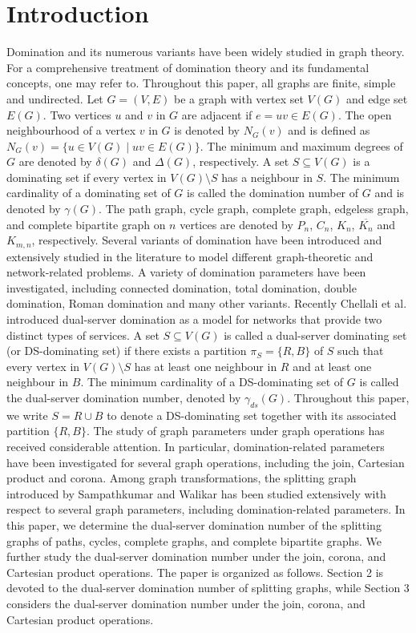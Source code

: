 \documentclass{article}
\begin{document}
\section{Introduction} Domination and its numerous variants have been widely studied in graph theory. For a comprehensive treatment of domination theory and its fundamental concepts, one may refer to\cite{Haynes1998,Haynes2023,HBW,Slater1998}. Throughout this paper, all graphs are finite, simple and undirected. Let $G=(V,E)$ be a graph with vertex set $V(G)$ and edge set $E(G).$ Two vertices $u$ and $v$ in $G$ are adjacent if $e = uv \in E(G).$ The open neighbourhood of a vertex $v$ in $G$ is denoted by $N_G(v)$ and is defined as
$N_G(v)=\{u \in V(G) \mid uv \in E(G)\}$. The minimum and maximum degrees of $G$ are denoted by $\delta(G)$ and $\Delta(G)$, respectively. A set $ S\subseteq V(G)$ is a dominating set if every vertex in $V(G) \setminus S$ has a neighbour in $S.$ The minimum cardinality of a dominating set of $G$ is called the domination number of $G$ and is denoted by $\gamma(G)$. The path graph, cycle graph, complete graph, edgeless graph, and complete bipartite graph on $n$ vertices are denoted by $P_n$, $C_n$, ${K_n}$, $\overline{K_n}$ and $K_{m,n}$, respectively. Several variants of domination have been introduced and extensively studied in the literature to model different graph-theoretic and network-related problems. A variety of domination parameters have been investigated, including connected domination, total domination, double domination, Roman domination and many other variants\cite{Haynes2023}. Recently Chellali et al.\cite{DS,TDS} introduced dual-server domination  as a model for networks that provide two distinct types of services. A set $S \subseteq V(G)$ is called a dual-server dominating set (or DS-dominating set) if there exists a partition $\pi_S=\{R,B\}$ of $S$ such that every vertex in $V(G)\setminus S$ has at least one neighbour in $R$ and at least one neighbour in $B.$ The minimum cardinality of a DS-dominating set of $G$ is called the dual-server domination number, denoted by $\gamma_{ds}(G).$ Throughout this paper, we write $S=R \cup B$ to denote a DS-dominating set together with its associated partition $\{R,B\}$. The study of graph parameters under graph operations has received considerable attention. In particular, domination-related parameters have been investigated for several graph operations, including the join, Cartesian product and corona\cite{West}. Among graph transformations, the splitting graph introduced by Sampathkumar and Walikar\cite{SPG} has been studied extensively with respect to several graph parameters, including domination-related parameters\cite{Deepalaxmi}. In this paper, we determine the dual-server domination number of the splitting graphs of paths, cycles, complete graphs, and complete bipartite graphs. We further study the dual-server domination number under the join, corona, and Cartesian product operations. The paper is organized as follows. Section 2 is devoted to the dual-server domination number of splitting graphs, while Section 3 considers the dual-server domination number under the join, corona, and Cartesian product operations.
\end{document}
